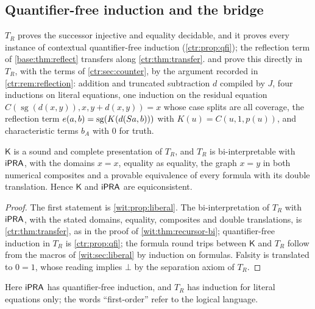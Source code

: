 \subsection{Quantifier-free induction and the bridge}

\begin{remark}
\label{wit:rem:reflection}
$T_R$ proves the successor injective and equality decidable, and it proves
every instance of contextual quantifier-free induction
(\cref{ctr:prop:qfi}); the reflection term of \cref{base:thm:reflect}
transfers along \cref{ctr:thm:transfer}.   and
 prove this directly in $T_R$, with the terms of
\cref{ctr:sec:counter}, by the argument recorded in
\cref{ctr:rem:reflection}: addition and truncated subtraction $d$ compiled
by $J$, four inductions on literal equations, one induction on the residual
equation $C(\operatorname{sg}(d(x,y)),x,y+d(x,y))=x$ whose case splits are
all coverage, the reflection term $e(a,b)=\operatorname{sg}(K(d(S a,b)))$
with $K(u)=C(u,1,p(u))$, and characteristic terms $b_A$ with $0$ for truth.
\end{remark}

\begin{theorem}
\label{wit:thm:k-bi}
$\mathsf{K}$ is a sound and complete presentation of $T_R$, and $T_R$ is
bi-interpretable with $\mathsf{iPRA}$, with the domains $x=x$, equality as
equality, the graph $x=y$ in both numerical composites and a provable
equivalence of every formula with its double translation.  Hence
$\mathsf{K}$ and $\mathsf{iPRA}$ are equiconsistent.
\end{theorem}

\begin{proof}
The first statement is \cref{wit:prop:liberal}.  The bi-interpretation of
$T_R$ with $\mathsf{iPRA}$, with the stated domains, equality, composites and
double translations, is \cref{ctr:thm:transfer}, as in the proof of
\cref{wit:thm:recursor-bi}; quantifier-free induction in $T_R$ is
\cref{ctr:prop:qfi}; the formula round trips between $\mathsf{K}$ and $T_R$
follow from the macros of \cref{wit:sec:liberal} by induction on formulas.
Falsity is translated to $0=1$, whose reading implies $\bot$ by the
separation axiom of $T_R$.
\end{proof}

Here $\mathsf{iPRA}$ has quantifier-free induction, and $T_R$ has induction for
literal equations only; the words ``first-order'' refer to the logical
language.

